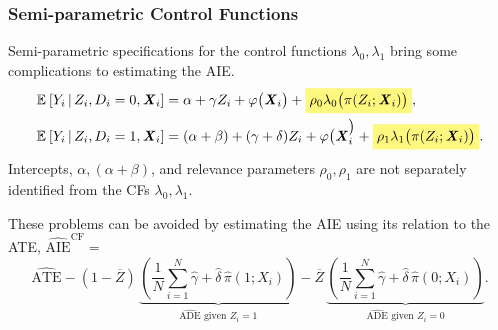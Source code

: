 \documentclass[dvipsnames]{beamer} %
\renewcommand{\vec}[1]{\boldsymbol{\mathit{#1}}}                           %
\newcommand{\Egiven}[3][]{\mathbb{E}_{#1} \left[ #2 \, \middle\vert \, #3 \right]} %
\renewcommand{\hat}[1]{\widehat{#1}}                                       %
\renewcommand{\bar}[1]{\overline{#1}}                                      %
\newcommand{\eqhighlight}[2]{\colorbox{#1!50}{$\displaystyle#2$}}
\begin{document}
\begin{frame}[noframenumbering]
    \frametitle{Semi-parametric Control Functions}
    \label{cf-semiparametric}
    Semi-parametric specifications for the control functions $\lambda_0, \lambda_1$ bring some complications to estimating the AIE.
    \begin{align*}
        \Egiven{Y_i}{Z_i, D_i = 0, \vec X_i} &=
            \alpha + \gamma Z_i + \varphi\big( \vec X_i \big)
            + \eqhighlight{yellow}{\rho_0 \lambda_0 \big( \pi(Z_i ; \vec X_i) \big)}, \\
        \Egiven{Y_i}{Z_i, D_i = 1, \vec X_i} &=
            (\alpha + \beta) + (\gamma + \delta) Z_i + \varphi\big( \vec X_i^\big)
            + \eqhighlight{yellow}{\rho_1 \lambda_1 \big( \pi(Z_i ; \vec X_i) \big)}.
    \end{align*}
    Intercepts, $\alpha, (\alpha + \beta)$, and relevance parameters $\rho_0, \rho_1$ are not separately identified from the CFs $\lambda_0, \lambda_1$.
    
    These problems can be avoided by estimating the AIE using its relation to the ATE, $\hat{\text{AIE}}^{\text{CF}} =$
    \[ \hat{\text{ATE}}
        - (1 - \bar Z) \, \underbrace{\left( 
            \frac 1N \sum_{i = 1}^N \hat\gamma + \hat \delta \, \hat\pi(1; \vec X_i) \right)}_{\hat{\text{ADE}}\text{ given }Z_i = 1}
        - \bar Z \, \underbrace{\left(
            \frac 1N \sum_{i = 1}^N \hat\gamma + \hat \delta \, \hat\pi(0; \vec X_i)  \right)}_{\hat{\text{ADE}}\text{ given }Z_i = 0}. \]
\end{frame}
\end{document}
